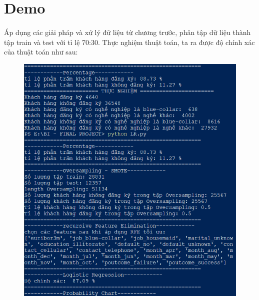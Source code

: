 \documentclass{report}
\begin{document}
    \section{Demo}
    \fontsize{13}{10}\selectfont\paragraph{}
        Áp dụng các giải pháp và xử lý đữ liệu từ chương trước, phân tập dữ liệu thành tập train và test với tỉ lệ 70:30. Thực nghiệm thuật toán, ta ra được độ chính xác của thuật toán như sau:
        \begin{center}
            \begin{figure}[htp]
                \begin{center}
                    \includegraphics[scale = 1]{image/LR_2.png}
                \end{center}
            \end{figure}
        \end{center}
    
    \pagebreak
    
\end{document}

